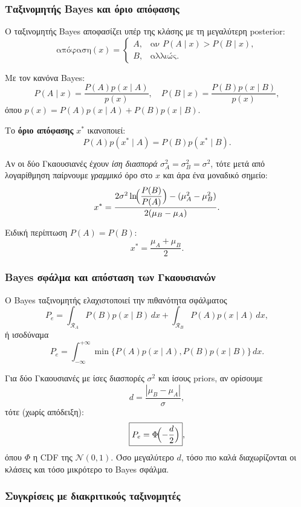 \documentclass[a4paper,11pt]{article}
\begin{document}
\subsubsection*{Ταξινομητής Bayes και όριο απόφασης}

Ο ταξινομητής Bayes αποφασίζει υπέρ της κλάσης με τη μεγαλύτερη posterior:
\[
\text{απόφαση}(x)=
\begin{cases}
A, & \text{αν }P(A\mid x) > P(B\mid x),\\
B, & \text{αλλιώς.}
\end{cases}
\]

Με τον κανόνα Bayes:
\[
P(A\mid x) = \frac{P(A)p(x\mid A)}{p(x)},\quad
P(B\mid x) = \frac{P(B)p(x\mid B)}{p(x)},
\]
όπου $p(x)=P(A)p(x\mid A)+P(B)p(x\mid B)$.

Το \textbf{όριο απόφασης} $x^\ast$ ικανοποιεί:
\[
P(A)p(x^\ast\mid A) = P(B)p(x^\ast\mid B).
\]

Αν οι δύο Γκαουσιανές έχουν \emph{ίση διασπορά} $\sigma_A^2=\sigma_B^2=\sigma^2$,
τότε μετά από λογαρίθμηση παίρνουμε \emph{γραμμικό} όρο στο $x$ και άρα
ένα μοναδικό σημείο:
\[
x^\ast = \frac{2\sigma^2 \ln\!\Bigl(\dfrac{P(B)}{P(A)}\Bigr)
    - (\mu_A^2 - \mu_B^2)}{2(\mu_B - \mu_A)}.
\]

Ειδική περίπτωση $P(A)=P(B)$:
\[
\boxed{x^\ast = \frac{\mu_A+\mu_B}{2}.}
\]

\subsubsection*{Bayes σφάλμα και απόσταση των Γκαουσιανών}

Ο Bayes ταξινομητής ελαχιστοποιεί την πιθανότητα σφάλματος
\[
P_e = \int_{\mathcal{R}_A} P(B)p(x\mid B)\,dx
    + \int_{\mathcal{R}_B} P(A)p(x\mid A)\,dx,
\]
ή ισοδύναμα
\[
P_e = \int_{-\infty}^{+\infty} \min\{P(A)p(x\mid A),P(B)p(x\mid B)\}\,dx.
\]

Για δύο Γκαουσιανές με ίσες διασπορές $\sigma^2$ και ίσους priors,
αν ορίσουμε
\[
d = \frac{|\mu_B-\mu_A|}{\sigma},
\]
τότε (χωρίς απόδειξη):
\[
\boxed{P_e = \Phi\!\Bigl(-\frac{d}{2}\Bigr)},
\]
όπου $\Phi$ η CDF της $\mathcal{N}(0,1)$. Όσο μεγαλύτερο $d$, τόσο πιο
καλά διαχωρίζονται οι κλάσεις και τόσο μικρότερο το Bayes σφάλμα.

\subsubsection*{Συγκρίσεις με διακριτικούς ταξινομητές}
\end{document}
